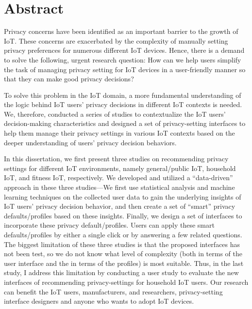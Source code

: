 \chapter*{Abstract}
Privacy concerns have been identified as an important barrier to the growth of IoT. These concerns are exacerbated by the complexity of manually setting privacy preferences for numerous different IoT devices. Hence, there is a demand to solve the following, urgent research question: How can we help users simplify the task of managing privacy setting for IoT devices in a user-friendly manner so that they can make good privacy decisions?

To solve this problem in the IoT domain, a more fundamental understanding of the logic behind IoT users' privacy decisions in different IoT contexts is needed. We, therefore, conducted a series of studies to contextualize the IoT users' decision-making characteristics and designed a set of privacy-setting interfaces to help them manage their privacy settings in various IoT contexts based on the deeper understanding of users' privacy decision behaviors. 

In this dissertation, we first present three studies on recommending privacy settings for different IoT environments, namely general/public IoT, household IoT, and fitness IoT, respectively. We developed and utilized a ``data-driven” approach in these three studies—We first use statistical analysis and machine learning techniques on the collected user data to gain the underlying insights of IoT users' privacy decision behavior, and then create a set of ``smart” privacy defaults/profiles based on these insights. Finally, we design a set of interfaces to incorporate these privacy default/profiles. Users can apply these smart defaults/profiles by either a single click or by answering a few related questions. The biggest limitation of these three studies is that the proposed interfaces has not been test, so we do not know what level of complexity (both in terms of the user interface and the in terms of the profiles) is most suitable. Thus, in the last study, I address this limitation by conducting a user study to evaluate the new interfaces of recommending privacy-settings for household IoT users. Our research can benefit the IoT users, manufacturers, and researchers, privacy-setting interface designers and anyone who wants to adopt IoT devices.


